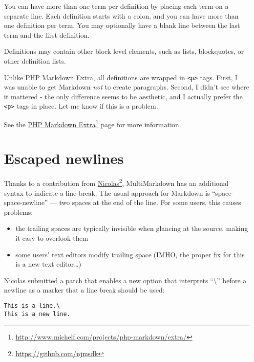 You can have more than one term per definition by placing each term on a
separate line. Each definition starts with a colon, and you can have more than
one definition per term. You may optionally have a blank line between the last
term and the first definition.

Definitions may contain other block level elements, such as lists,
blockquotes, or other definition lists.

Unlike PHP Markdown Extra, all definitions are wrapped in \texttt{<p>} tags. First, I
was unable to get Markdown \emph{not} to create paragraphs. Second, I didn't see
where it mattered - the only difference seems to be aesthetic, and I actually
prefer the \texttt{<p>} tags in place. Let me know if this is a problem.

See the \href{http://www.michelf.com/projects/php-markdown/extra/}{PHP Markdown Extra}\footnote{\href{http://www.michelf.com/projects/php-markdown/extra/}{http:\slash{}\slash{}www.michelf.com\slash{}projects\slash{}php-markdown\slash{}extra\slash{}}} page for more information.

\section{Escaped newlines}
\label{escapednewlines}

Thanks to a contribution from \href{https://github.com/njmsdk}{Nicolas}\footnote{\href{https://github.com/njmsdk}{https:\slash{}\slash{}github.com\slash{}njmsdk}}, MultiMarkdown has an additional syntax to indicate a line break. The usual approach for Markdown is ``space-space-newline'' --- two spaces at the end of the line. For some users, this causes problems:

\begin{itemize}
\item the trailing spaces are typically invisible when glancing at the source, making it easy to overlook them

\item some users' text editors modify trailing space (IMHO, the proper fix for this is a new text editor{\ldots})

\end{itemize}

Nicolas submitted a patch that enables a new option that interprets ``\textbackslash{}'' before a newline as a marker that a line break should be used:

\begin{verbatim}
This is a line.\
This is a new line.
\end{verbatim}

